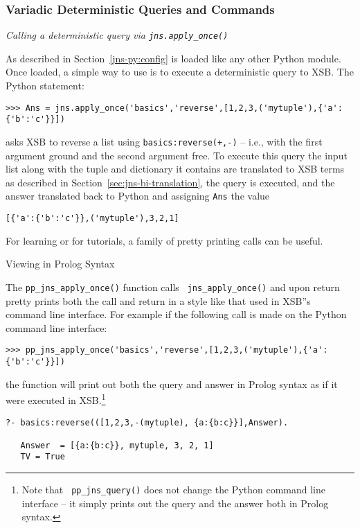 \subsubsection{Variadic Deterministic Queries and Commands}

\begin{example} \rm \label{ex:apply-once-reverse}
{\em Calling a deterministic query via {\tt jns.apply\_once()}} \label{ex:apply-once}
  
  As described in Section~\ref{jns-py:config} \janus{} is loaded like
  any other Python module.  Once loaded, a simple way to use \janus{}
  is to execute a deterministic query to XSB.  The Python statement:
{\small
\begin{verbatim}  
>>> Ans = jns.apply_once('basics','reverse',[1,2,3,('mytuple'),{'a':{'b':'c'}}])
\end{verbatim}
}
\noindent
  asks XSB to reverse a list using {\tt basics:reverse(+,-)} -- i.e.,
  with the first argument ground and the second argument free.  To
  execute this query the input list along with the tuple and
  dictionary it contains are translated to XSB terms as described in
  Section~\ref{sec:jns-bi-translation}, the query is executed, and the
  answer translated back to Python and assigning {\tt Ans} the value
\begin{verbatim}
[{'a':{'b':'c'}},('mytuple'),3,2,1]
\end{verbatim}
\end{example}
For learning \janus{} or for tutorials, a family of pretty printing
calls can be useful.

\begin{example} Viewing \januspy{} in Prolog Syntax \rm \label{ex:janus-py-pp}
  
The {\tt pp\_jns\_apply\_once()} function calls {\tt
  jns\_apply\_once()} and upon return pretty prints both the call and return
in a style like that used in XSB''s command line interface.  For
example if the following call is made on the Python command line
interface:

\begin{verbatim}
>>> pp_jns_apply_once('basics','reverse',[1,2,3,('mytuple'),{'a':{'b':'c'}}])
\end{verbatim}
\noindent
the function will print out both the query and answer in Prolog syntax
as if it were executed in XSB.\footnote{Note that {\tt
  pp\_jns\_query()} does not change the Python command line interface
-- it simply prints out the query and the answer both in Prolog
syntax.}

{\small
\begin{verbatim} 
?- basics:reverse(([1,2,3,-(mytuple), {a:{b:c}}],Answer).

   Answer  = [{a:{b:c}}, mytuple, 3, 2, 1]
   TV = True
\end{verbatim}
}
\end{example}

